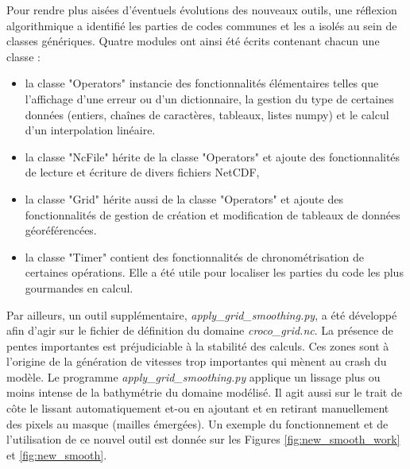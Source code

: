 \documentclass[10pt,a4paper,titlepage]{article}
\begin{document}
Pour rendre plus aisées d'éventuels évolutions des nouveaux outils, une réflexion algorithmique a identifié les parties de codes communes et les a isolés au sein de classes génériques.
Quatre modules ont ainsi été écrits contenant chacun une classe :
\begin{itemize}
    \item la classe "Operators" instancie des fonctionnalités élémentaires telles que l'affichage d'une erreur ou d'un dictionnaire, la gestion du type de certaines données (entiers, chaînes de caractères, tableaux, listes numpy) et le calcul d'un interpolation linéaire.
    \item la classe "NcFile" hérite de la classe "Operators" et ajoute des fonctionnalités de lecture et écriture de divers fichiers NetCDF,
    \item la classe "Grid" hérite aussi de la classe "Operators" et ajoute des fonctionnalités de gestion de création et modification de tableaux de données géoréférencées.
    \item la classe "Timer" contient des fonctionnalités de chronométrisation de certaines opérations.
    Elle a été utile pour localiser les parties du code les plus gourmandes en calcul.
\end{itemize}

Par ailleurs, un outil supplémentaire, \textit{apply\_grid\_smoothing.py}, a été développé afin d'agir sur le fichier de définition du domaine \textit{croco\_grid.nc}.
La présence de pentes importantes est préjudiciable à la stabilité des calculs.
Ces zones sont à l'origine de la génération de vitesses trop importantes qui mènent au crash du modèle.
Le programme \textit{apply\_grid\_smoothing.py} applique un lissage plus ou moins intense de la bathymétrie du domaine modélisé.
Il agit aussi sur le trait de côte le lissant automatiquement et-ou en ajoutant et en retirant manuellement des pixels au masque (mailles émergées).
Un exemple du fonctionnement et de l'utilisation de ce nouvel outil est donnée sur les Figures \ref{fig:new_smooth_work} et \ref{fig:new_smooth}.
\end{document}
